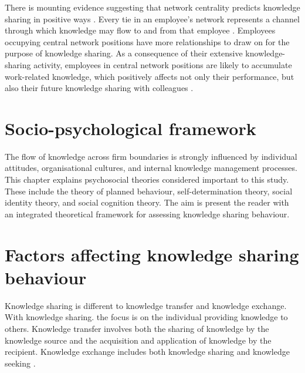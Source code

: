 There is mounting evidence suggesting that network centrality predicts knowledge sharing in positive ways \citep[e.g.][]{freeman1979centrality,burt1992structural,tsai2001knowledge}. Every tie in an employee’s network represents a channel through which knowledge may flow to and from that employee \citep{anderson2008social}. Employees occupying central network positions have more relationships to draw on for the purpose of knowledge sharing. As a consequence of their extensive knowledge-sharing activity, employees in central network positions are likely to accumulate work-related knowledge, which positively affects not only their performance, but also their future knowledge sharing with colleagues \citep{sparrowe2001social}.




\section{Socio-psychological framework}

The flow of knowledge across firm boundaries is strongly influenced by individual attitudes, organisational cultures, and internal knowledge management processes. This chapter explains psychosocial theories considered important to this study. These include the theory of planned behaviour, self-determination theory, social identity theory, and social cognition theory. The aim is present the reader with an integrated theoretical framework for assessing knowledge sharing behaviour.

\section{Factors affecting knowledge sharing behaviour}

Knowledge sharing is different to knowledge transfer and knowledge exchange. With knowledge sharing. the focus is on the individual providing knowledge to others. Knowledge transfer involves both the sharing of knowledge by the knowledge source and the acquisition and application of knowledge by the recipient. Knowledge exchange includes both knowledge sharing and knowledge seeking \citep{wang2010knowledge}.

